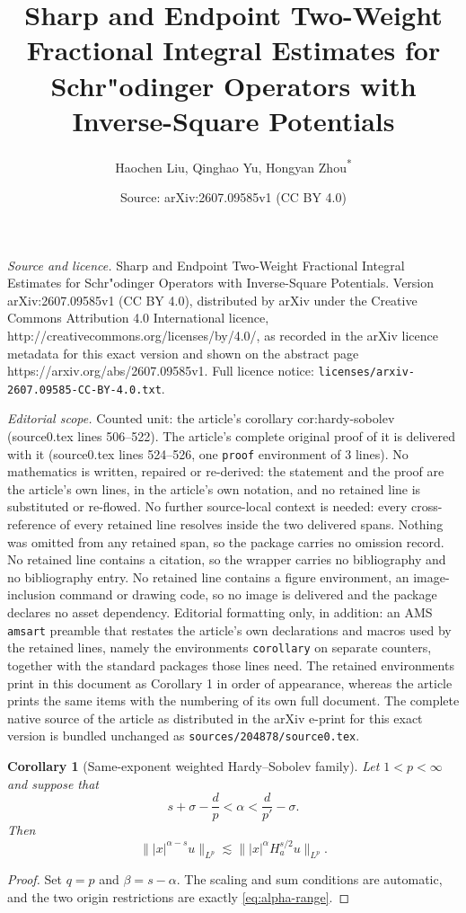 \documentclass[10pt,a4paper]{amsart}
\title{Sharp and Endpoint Two-Weight Fractional Integral Estimates for Schr"odinger Operators with Inverse-Square Potentials}
\author{Haochen Liu, Qinghao Yu, Hongyan Zhou\texorpdfstring{\textsuperscript{*}}{*}}
\date{Source: arXiv:2607.09585v1 (CC BY 4.0)}
\newtheorem{corollary}{Corollary}
\newcommand{\Ha}{H_a}
\begin{document}
\maketitle

\noindent\emph{Source and licence.} Sharp and Endpoint Two-Weight Fractional Integral Estimates for Schr"odinger Operators with Inverse-Square Potentials. Version arXiv:2607.09585v1 (CC BY 4.0), distributed by arXiv under the Creative Commons Attribution 4.0 International licence, http://creativecommons.org/licenses/by/4.0/, as recorded in the arXiv licence metadata for this exact version and shown on the abstract page https://arxiv.org/abs/2607.09585v1. Full licence notice: \texttt{licenses/arxiv-2607.09585-CC-BY-4.0.txt}.\par\smallskip

\noindent\textit{Editorial scope.} Counted unit: the article's corollary cor:hardy-sobolev (source0.tex lines 506--522). The article's complete original proof of it is delivered with it (source0.tex lines 524--526, one \texttt{proof} environment of 3 lines). No mathematics is written, repaired or re-derived: the statement and the proof are the article's own lines, in the article's own notation, and no retained line is substituted or re-flowed.  No further source-local context is needed: every cross-reference of every retained line resolves inside the two delivered spans.  Nothing was omitted from any retained span, so the package carries no omission record.  No retained line contains a citation, so the wrapper carries no bibliography and no bibliography entry.  No retained line contains a figure environment, an image-inclusion command or drawing code, so no image is delivered and the package declares no asset dependency.  Editorial formatting only, in addition: an AMS \texttt{amsart} preamble that restates the article's own declarations and macros used by the retained lines, namely the environments \texttt{corollary} on separate counters, together with the standard packages those lines need.  The retained environments print in this document as Corollary 1 in order of appearance, whereas the article prints the same items with the numbering of its own full document.  The complete native source of the article as distributed in the arXiv e-print for this exact version is bundled unchanged as \texttt{sources/204878/source0.tex}.
\begin{corollary}[Same-exponent weighted Hardy--Sobolev family]
\label{cor:hardy-sobolev}
Let $1<p<\infty$ and suppose that
\begin{equation}
 s+\sigma-\frac d p
 <\alpha
 <\frac d{p'}-\sigma.
 \label{eq:alpha-range}
\end{equation}
Then
\begin{equation}
 \bigl\||x|^{\alpha-s}u\bigr\|_{L^p}
 \lesssim
 \bigl\||x|^\alpha\Ha^{s/2}u\bigr\|_{L^p}.
 \label{eq:hardy-sobolev-family}
\end{equation}
\end{corollary}

\begin{proof}
Set $q=p$ and $\beta=s-\alpha$. The scaling and sum conditions are automatic, and the two origin restrictions are exactly \cref{eq:alpha-range}.
\end{proof}
\end{document}
